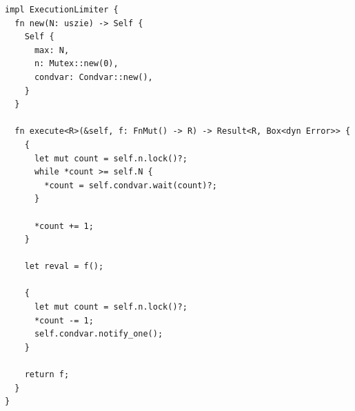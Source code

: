\documentclass[12pt]{article}
\begin{document}
\begin{itemize}
\begin{lstlisting}[langua=rust]
impl ExecutionLimiter {
  fn new(N: uszie) -> Self {
    Self {
      max: N,
      n: Mutex::new(0),
      condvar: Condvar::new(),
    }
  }

  fn execute<R>(&self, f: FnMut() -> R) -> Result<R, Box<dyn Error>> {
    {
      let mut count = self.n.lock()?;
      while *count >= self.N {
        *count = self.condvar.wait(count)?;
      }

      *count += 1;
    }
    
    let reval = f();

    {
      let mut count = self.n.lock()?;
      *count -= 1;
      self.condvar.notify_one();
    }

    return f;
  }
}
  \end{lstlisting}

  



\end{itemize}
\end{document}
